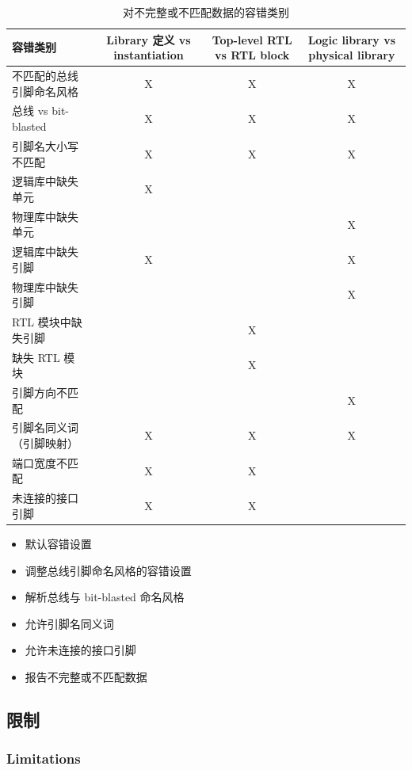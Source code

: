 \begin{table}[htbp]
\centering
\caption{对不完整或不匹配数据的容错类别}
\label{tab:tol-cats}
\small
\begin{tabularx}{\textwidth}{@{}X ccc@{}}
\toprule
\textbf{容错类别} &
\textbf{Library 定义 vs instantiation} &
\textbf{Top-level RTL vs RTL block} &
\textbf{Logic library vs physical library} \\
\midrule
不匹配的总线引脚命名风格 & X & X & X \\
总线 vs bit-blasted & X & X & X \\
引脚名大小写不匹配 & X & X & X \\
逻辑库中缺失单元 & X & & \\
物理库中缺失单元 & & & X \\
逻辑库中缺失引脚 & X & & X \\
物理库中缺失引脚 & & & X \\
RTL 模块中缺失引脚 & & X & \\
缺失 RTL 模块 & & X & \\
引脚方向不匹配 & & & X \\
引脚名同义词（引脚映射） & X & X & X \\
端口宽度不匹配 & X & X & \\
未连接的接口引脚 & X & X & \\
\bottomrule
\end{tabularx}
\end{table}

\begin{seeAlsoBox}
\begin{itemize}
  \item 默认容错设置
  \item 调整总线引脚命名风格的容错设置
  \item 解析总线与 bit-blasted 命名风格
  \item 允许引脚名同义词
  \item 允许未连接的接口引脚
  \item 报告不完整或不匹配数据
\end{itemize}
\end{seeAlsoBox}

\subsection{限制}
\subsubsection*{Limitations}

